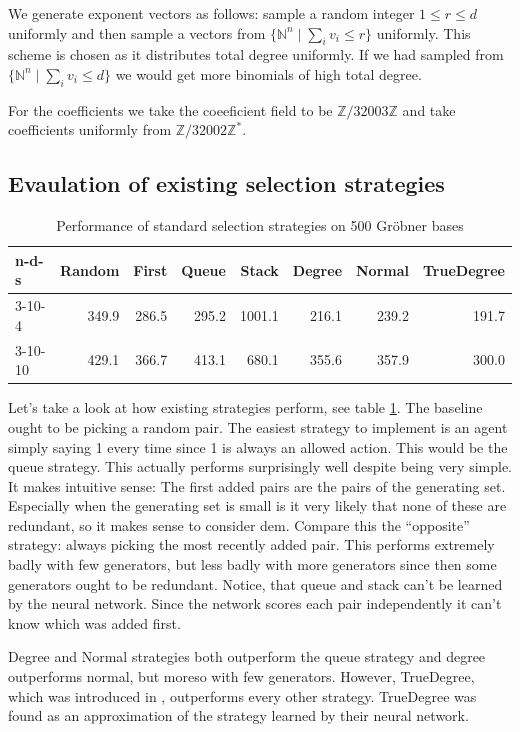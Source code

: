 \documentclass{article}
\theoremstyle{changedot}
\theoremstyle{changedotbreak}
\theoremstyle{nonumberplain}
\newcommand{\m}{\mathbb}
\begin{document}
We generate exponent vectors as follows: sample a random integer $1 \leq r \leq d$ uniformly and then sample a vectors from $\{\m N^{n} \mid \sum_{i} v_{i} \leq r\}$ uniformly. This scheme is chosen as it distributes total degree uniformly. If we had sampled from $\{\m N^{n} \mid \sum_{i} v_{i} \leq d\}$ we would get more binomials of high total degree.

For the coefficients we take the coeeficient field to be $\m Z / 32003 \m Z$ and take coefficients uniformly from $\m Z / 32002\m Z ^{*}$. 

\subsection{Evaulation of existing selection strategies}
\begin{table}
  \begin{center}
  \begin{tabular}{lrrrrrrr}
    n-d-s   & Random & First & Queue & Stack  & Degree & Normal & TrueDegree \\ \hline
    3-10-4  & 349.9  & 286.5 & 295.2 & 1001.1 & 216.1  & 239.2  & 191.7 \\
    3-10-10 & 429.1  & 366.7 & 413.1 & 680.1  & 355.6  & 357.9  & 300.0
  \end{tabular}
  \end{center}
  \caption{Performance of standard selection strategies on 500 Gröbner bases}
  \label{tab:std_perf}
\end{table}

Let's take a look at how existing strategies perform, see table \ref{tab:std_perf}. The baseline ought to be picking a random pair. The easiest strategy to implement is an agent simply saying 1 every time since 1 is always an allowed action. This would be the queue strategy. This actually performs surprisingly well despite being very simple. It makes intuitive sense: The first added pairs are the pairs of the generating set. Especially when the generating set is small is it very likely that none of these are redundant, so it makes sense to consider dem. Compare this the ``opposite'' strategy: always picking the most recently added pair. This performs extremely badly with few generators, but less badly with more generators since then some generators ought to be redundant. Notice, that queue and stack can't be learned by the neural network. Since the network scores each pair independently it can't know which was added first.

Degree and Normal strategies both outperform the queue strategy and degree outperforms normal, but moreso with few generators. However, TrueDegree, which was introduced in \cite{peifer}, outperforms every other strategy. TrueDegree was found as an approximation of the strategy learned by their neural network.
\end{document}

